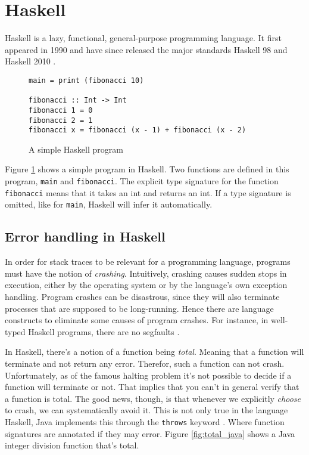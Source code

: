 \section{Haskell}

Haskell is a lazy, functional, general-purpose programming language.
\cite{haskell_report2010}
It first appeared in 1990 \cite{HistoryOfHaskell2007}  and have since
released the major standards Haskell 98 and Haskell 2010
\cite{haskell_report2010}.

\begin{figure}
\begin{mdframed}
  \begin{verbatim}
main = print (fibonacci 10)

fibonacci :: Int -> Int
fibonacci 1 = 0
fibonacci 2 = 1
fibonacci x = fibonacci (x - 1) + fibonacci (x - 2)
  \end{verbatim}
  \caption{A simple Haskell program}
  \label{fig:simple_program}
\end{mdframed}
\end{figure}

Figure \ref{fig:simple_program} shows a simple program in Haskell.
Two functions are defined in this program, \texttt{main} and
\texttt{fibonacci}.  The explicit type signature for the function
\texttt{fibonacci} means that it takes an int and returns an int. If a type
signature is omitted, like for \texttt{main}, Haskell will infer it automatically.

\subsection{Error handling in Haskell}

In order for stack traces to be relevant for a programming language, programs
must have the notion of \emph{crashing}. Intuitively, crashing causes sudden
stops in execution, either by the operating system or by the language's own
exception handling. Program crashes can be disastrous, since they will also
terminate processes that are supposed to be long-running. Hence there are
language constructs to eliminate some causes of program crashes.
For instance,
in well-typed Haskell programs, there are no segfaults \cite{FindingTheNeedle2009}.

In Haskell, there's a notion of a function being \emph{total}. Meaning
that a function will terminate and not return any error. Therefor,
such a function can not crash. Unfortunately, as of the famous halting
problem it's not possible to decide if a function will terminate or not.
That implies that you can't in general
verify that a function is total. \cite[p.380]{Hopcroft:2000}
The good news, though, is that whenever we
explicitly \emph{choose} to crash, we can systematically avoid it. This is not
only true in the language Haskell, Java implements this through the
\texttt{throws} keyword \cite{oracle_java_doc_method_throws}. Where
function signatures are annotated if they may error.
Figure \ref{fig:total_java} shows a Java integer division function that's
total.

